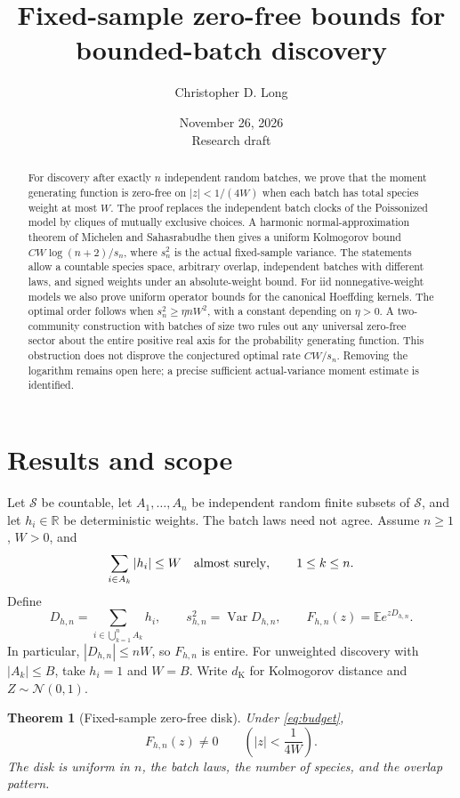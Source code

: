 \documentclass[11pt]{article}
\title{Fixed-sample zero-free bounds for bounded-batch discovery}
\author{Christopher D. Long}
\date{November 26, 2026\\[3pt]\small Research draft}
\numberwithin{equation}{section}
\newtheorem{theorem}{Theorem}[section]
\theoremstyle{remark}\newtheorem{remark}[theorem]{Remark}
\newcommand{\E}{\mathbb E}\newcommand{\Pp}{\mathbb P}
\newcommand{\R}{\mathbb R}\newcommand{\C}{\mathbb C}
\newcommand{\Var}{\operatorname{Var}}\newcommand{\ind}{\mathbf1}
\newcommand{\Normal}{\mathcal N(0,1)}
\begin{document}
\maketitle
\begin{abstract}
For discovery after exactly $n$ independent random batches, we prove that
the moment generating function is zero-free on $|z|<1/(4W)$ when each
batch has total species weight at most $W$. The proof replaces the
independent batch clocks of the Poissonized model by cliques of mutually
exclusive choices. A harmonic normal-approximation theorem of
Michelen and Sahasrabudhe then gives a uniform Kolmogorov bound
$CW\log(n+2)/s_n$, where $s_n^2$ is the actual fixed-sample variance.
The statements allow a countable species space, arbitrary overlap,
independent batches with different laws, and signed weights under an
absolute-weight bound. For iid nonnegative-weight models we also prove
uniform operator bounds for the canonical Hoeffding kernels. The optimal
order follows when $s_n^2\ge\eta nW^2$, with a constant depending on
$\eta>0$. A
two-community construction with batches of size two rules out any
universal zero-free sector about the entire positive real axis for the
probability generating function. This obstruction does not disprove the
conjectured optimal rate $CW/s_n$. Removing the logarithm remains open
here; a precise sufficient actual-variance moment estimate is identified.
\end{abstract}

\section{Results and scope}\label{sec:results}
Let $\mathcal S$ be countable, let $A_1,\ldots,A_n$ be independent random
finite subsets of $\mathcal S$, and let $h_i\in\R$ be deterministic weights.
The batch laws need not agree. Assume $n\ge1$, $W>0$, and
\begin{equation}\label{eq:budget}
 \sum_{i\in A_k}|h_i|\le W\quad\hbox{almost surely},\qquad 1\le k\le n.
\end{equation}
Define
\[
 D_{h,n}=\sum_{i\in\bigcup_{k=1}^n A_k}h_i,
 \qquad s_{h,n}^2=\Var D_{h,n},
 \qquad F_{h,n}(z)=\E e^{zD_{h,n}}.
\]
In particular, $|D_{h,n}|\le nW$, so $F_{h,n}$ is entire. For unweighted
discovery with $|A_k|\le B$, take $h_i=1$ and $W=B$. Write $d_{\mathrm K}$
for Kolmogorov distance and $Z\sim\Normal$.

\begin{theorem}[Fixed-sample zero-free disk]\label{thm:disk}
Under \eqref{eq:budget},
\begin{equation}\label{eq:disk}
 F_{h,n}(z)\ne0\qquad\left(|z|<\frac1{4W}\right).
\end{equation}
The disk is uniform in $n$, the batch laws, the number of species, and the
overlap pattern.
\end{theorem}
\end{document}
